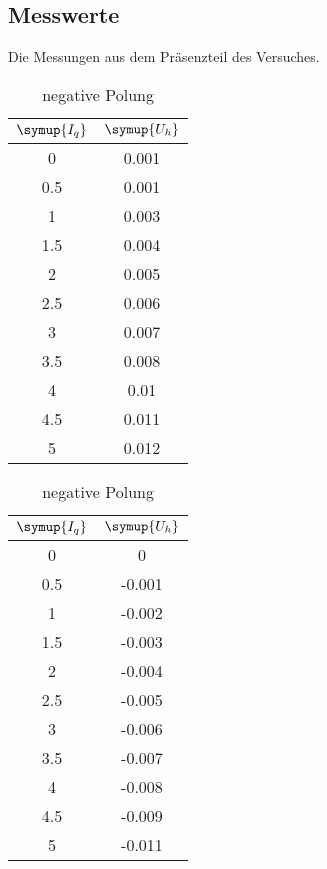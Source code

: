 \subsection{Messwerte}
Die Messungen aus dem Präsenzteil des Versuches.


\begin{table}
    \caption*{\textbf{Hallspannung; Magnetfeld konstant}}
    \begin{minipage}{0.49\textwidth}
          \centering  
          \caption{positive Polung}
          \label{tab:bconst}
          \begin{tabular}{c c}
            \toprule
            $\symup{I_q}$ & $\symup{U_h}$ \\
            \midrule
            0   & 0.001 \\
            0.5 & 0.001 \\
            1   & 0.003 \\
            1.5 & 0.004 \\
            2   & 0.005 \\
            2.5 & 0.006 \\
            3   & 0.007 \\
            3.5 & 0.008 \\
            4   & 0.01  \\
            4.5 & 0.011 \\
            5   & 0.012 \\
            \bottomrule
        \end{tabular}
    \end{minipage}
    \hfill
    \begin{minipage}{0.49\textwidth}
        \centering
          \caption{negative Polung}
          \label{tab:bconst-}
           \begin{tabular}{c c}
            \toprule
            $\symup{I_q}$ & $\symup{U_h}$ \\
            \midrule
            0   &  0     \\
            0.5 & -0.001 \\
            1   & -0.002 \\
            1.5 & -0.003 \\
            2   & -0.004 \\
            2.5 & -0.005 \\
            3   & -0.006 \\
            3.5 & -0.007 \\
            4   & -0.008 \\
            4.5 & -0.009 \\
            5   & -0.011 \\
            \bottomrule
       \end{tabular}
     \end{minipage}
  \end{table}



